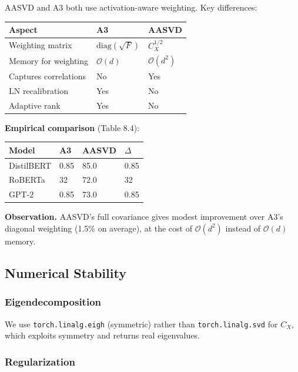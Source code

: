 AASVD and A3 both use activation-aware weighting. Key differences:

\begin{table}[H]
\centering
\small
\begin{tabular}{lll}
\toprule
\textbf{Aspect} & \textbf{A3} & \textbf{AASVD} \\
\midrule
Weighting matrix & $\mathrm{diag}(\sqrt{F})$ & $C_X^{1/2}$ \\
Memory for weighting & $\mathcal{O}(d)$ & $\mathcal{O}(d^2)$ \\
Captures correlations & No & Yes \\
LN recalibration & Yes & No \\
Adaptive rank & Yes & No \\
\bottomrule
\end{tabular}
\end{table}

\textbf{Empirical comparison} (Table 8.4):

\begin{table}[H]
\centering
\small
\begin{tabular}{llll}
\toprule
\textbf{Model} & \textbf{A3} & \textbf{AASVD} & \textbf{$\Delta$} \\
\midrule
DistilBERT & 0.85 & 85.0 & 0.85 \\
RoBERTa & 32 & 72.0 & 32 \\
GPT-2 & 0.85 & 73.0 & 0.85 \\
\bottomrule
\end{tabular}
\end{table}

\textbf{Observation.} AASVD's full covariance gives modest improvement over A3's 
diagonal weighting (1.5\% on average), at the cost of 
$\mathcal{O}(d^2)$ instead of $\mathcal{O}(d)$ memory.

\subsection{Numerical Stability}

\subsubsection{Eigendecomposition}

We use \texttt{torch.linalg.eigh} (symmetric) rather than \texttt{torch.linalg.svd} for 
$C_X$, which exploits symmetry and returns real eigenvalues.

\subsubsection{Regularization}

